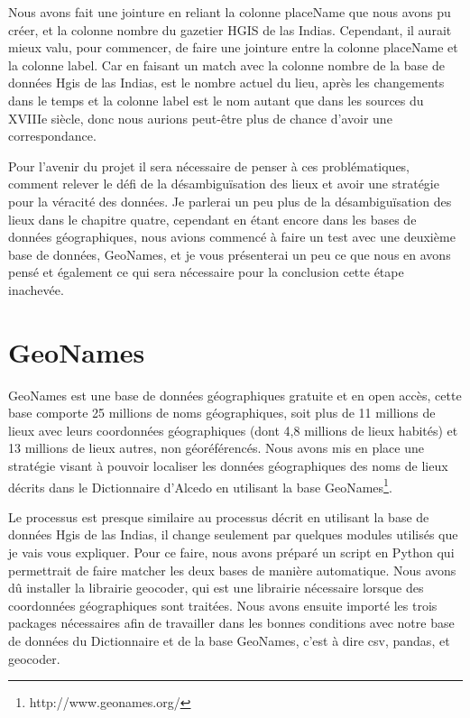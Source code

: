 \documentclass[a4paper,12pt,twoside]{book}
\begin{document}
Nous avons fait une jointure en reliant la colonne placeName que nous avons pu créer, et la colonne nombre du gazetier HGIS de las Indias. Cependant, il aurait mieux valu, pour commencer, de faire une jointure entre la colonne placeName et la colonne label. Car en faisant un match avec la colonne nombre de la base de données Hgis de las Indias, est le nombre actuel du lieu, après les changements dans le temps et la colonne label est le nom autant que dans les sources du XVIIIe siècle, donc nous aurions peut-être plus de chance d’avoir une correspondance.

Pour l’avenir du projet il sera nécessaire de penser à ces problématiques, comment relever le défi de la désambiguïsation des lieux et avoir une stratégie pour la véracité des données. Je parlerai un peu plus de la désambiguïsation des lieux dans le chapitre quatre, cependant en étant encore dans les bases de données géographiques, nous avions commencé à faire un test avec une deuxième base de données, GeoNames, et je vous présenterai un peu ce que nous en avons pensé et également ce qui sera nécessaire pour la conclusion cette étape inachevée.

\section{GeoNames}

GeoNames est une base de données géographiques gratuite et en open accès, cette base comporte 25 millions de noms géographiques, soit plus de 11 millions de lieux avec leurs coordonnées géographiques (dont 4,8 millions de lieux habités) et 13 millions de lieux autres, non géoréférencés. Nous avons mis en place une stratégie visant à pouvoir localiser les données géographiques des noms de lieux décrits dans le Dictionnaire d’Alcedo en utilisant la base GeoNames\footnote{http://www.geonames.org/}. 

Le processus est presque similaire au processus décrit en utilisant la base de données Hgis de las Indias, il change seulement par quelques modules utilisés que je vais vous expliquer. Pour ce faire, nous avons préparé un script en Python qui permettrait de faire matcher les deux bases de manière automatique. Nous avons dû installer la librairie geocoder, qui est une librairie nécessaire lorsque des coordonnées géographiques sont traitées. Nous avons ensuite importé les trois packages nécessaires afin de travailler dans les bonnes conditions avec notre base de données du Dictionnaire et de la base GeoNames, c’est à dire csv, pandas, et geocoder.
\end{document}
